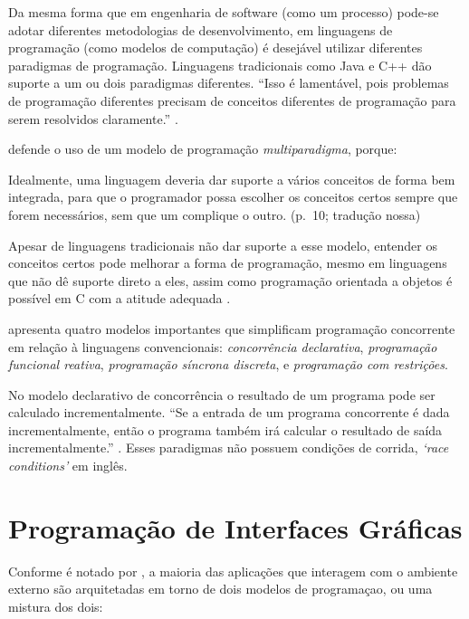 Da mesma forma que em engenharia de software (como um processo) pode-se adotar
diferentes metodologias de desenvolvimento, em linguagens de programação (como
modelos de computação) é desejável utilizar diferentes paradigmas de
programação.
Linguagens tradicionais como Java e C++ dão suporte a um ou dois paradigmas
diferentes.
“Isso é lamentável, pois problemas de programação diferentes precisam de
conceitos diferentes de programação para serem resolvidos claramente.”
\cite[p. 10]{roy2009}.

\textcite{roy2009} defende o uso de um modelo de programação \emph{multiparadigma},
porque:

\begin{citacao}
  Idealmente, uma linguagem deveria dar suporte a vários conceitos de forma
  bem integrada, para que o programador possa escolher os conceitos certos
  sempre que forem necessários, sem que um complique o outro.
  (p.~10; tradução nossa)
\end{citacao}

Apesar de linguagens tradicionais não dar suporte a esse modelo, entender os
conceitos certos pode melhorar a forma de programação, mesmo em linguagens que
não dê suporte direto a eles, assim como programação orientada a objetos é
possível em C com a atitude adequada \cite{roy2009}.

\textcite{roy2009} apresenta quatro modelos importantes que simplificam
programação concorrente em relação à linguagens convencionais: \emph{concorrência
declarativa}, \emph{programação funcional reativa}, \emph{programação síncrona
discreta}, e \emph{programação com restrições}.

No modelo declarativo de concorrência o resultado de um programa pode ser
calculado incrementalmente.
“Se a entrada de um programa concorrente é dada incrementalmente, então o
programa também irá calcular o resultado de saída incrementalmente.”
\cite[p. 238; tradução nossa]{roy2004}.
Esses paradigmas não possuem condições de corrida, \emph{‘race conditions’} em
inglês.

\section{Programação de Interfaces Gráficas}
\label{sec:org90adba0}

Conforme é notado por \textcite{blackheath2016}, a maioria das aplicações que
interagem com o ambiente externo são arquitetadas em torno de dois modelos de
programaçao, ou uma mistura dos dois:


